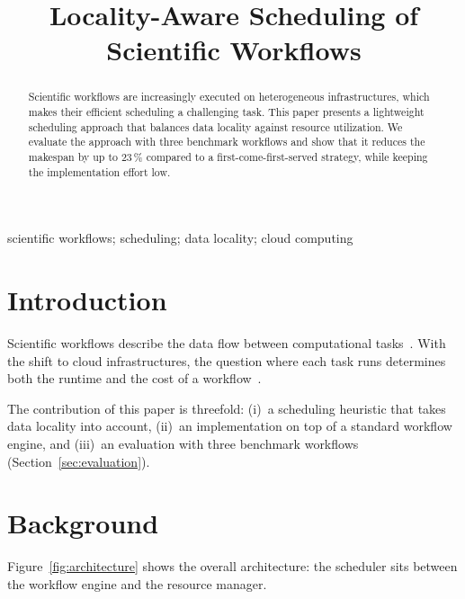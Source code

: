 \title{Locality-Aware Scheduling of Scientific Workflows}
\author{%
  \and
}
\maketitle

\begin{abstract}
Scientific workflows are increasingly executed on heterogeneous infrastructures, which makes their efficient scheduling a challenging task.
This paper presents a lightweight scheduling approach that balances data locality against resource utilization.
We evaluate the approach with three benchmark workflows and show that it reduces the makespan by up to 23\,\% compared to a first-come-first-served strategy, while keeping the implementation effort low.
\end{abstract}

\begin{IEEEkeywords}
scientific workflows; scheduling; data locality; cloud computing
\end{IEEEkeywords}

\section{Introduction}\label{sec:introduction}
Scientific workflows describe the data flow between computational tasks~\cite{Winery}.
With the shift to cloud infrastructures, the question where each task runs determines both the runtime and the cost of a workflow~\cite{Binz2009}.
\lipsum[1]

The contribution of this paper is threefold: (i)~a scheduling heuristic that takes data locality into account, (ii)~an implementation on top of a standard workflow engine, and (iii)~an evaluation with three benchmark workflows (Section~\ref{sec:evaluation}).
\lipsum[2-3]

\section{Background}\label{sec:background}
\lipsum[4]
Figure~\ref{fig:architecture} shows the overall architecture: the scheduler sits between the workflow engine and the resource manager.

